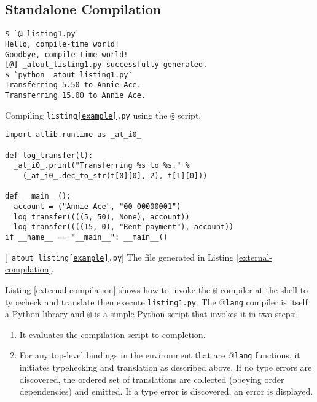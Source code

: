 \documentclass[9pt,preprint]{sigplanconf}
\newcommand{\lstinlinep}[1]{\lstinline[language=Python,basicstyle=\ttfamily\small]{#1}}
\begin{document}
\subsection{Standalone Compilation}\label{compilation} 
\begin{codelisting}[t]
\begin{lstlisting}[style=Bash]
$ `@ listing1.py`
Hello, compile-time world!
Goodbye, compile-time world!
[@] _atout_listing1.py successfully generated.
$ `python _atout_listing1.py`
Transferring 5.50 to Annie Ace.
Transferring 15.00 to Annie Ace.
\end{lstlisting}
\caption{Compiling \texttt{listing\ref{example}.py} using the \texttt{@} script.}
\label{external-compilation}
\end{codelisting}
\begin{codelisting}[t]
\begin{lstlisting}
import atlib.runtime as _at_i0_

def log_transfer(t):
  _at_i0_.print("Transferring %s to %s." % 
    (_at_i0_.dec_to_str(t[0][0], 2), t[1][0]))

def __main__():
  account = ("Annie Ace", "00-00000001")
  log_transfer((((5, 50), None), account))
  log_transfer((((15, 0), "Rent payment"), account))
if __name__ == "__main__": __main__()
\end{lstlisting}
\caption{[\texttt{\_atout\_listing\ref{example}.py}] The file generated in Listing \ref{external-compilation}.}
\label{example-out}
\end{codelisting}


Listing \ref{external-compilation} shows how to invoke the \lstinlinep{@} compiler at the shell to typecheck and translate then execute \lstinlinep{listing1.py}. %
The @\texttt{lang} compiler is itself a Python library and \lstinlinep{@} is a simple Python script that invokes it in two steps:
\begin{enumerate}
\item It evaluates the compilation script to completion.
\item For any top-level bindings in the environment that are @\texttt{lang} functions, it initiates typehecking and translation as described above. If no type errors are discovered, the ordered set of translations are collected (obeying order dependencies) and emitted. If a type error is discovered, an error is displayed.
\end{enumerate}
\end{document}
